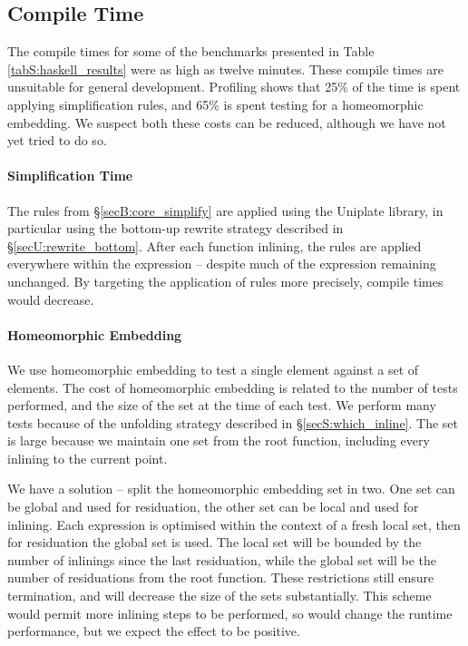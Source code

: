 \subsection{Compile Time}
\label{secS:compile_time}

The compile times for some of the benchmarks presented in Table \ref{tabS:haskell_results} were as high as twelve minutes. These compile times are unsuitable for general development. Profiling shows that 25\% of the time is spent applying simplification rules, and 65\% is spent testing for a homeomorphic embedding. We suspect both these costs can be reduced, although we have not yet tried to do so.

\paragraph{Simplification Time} The rules from \S\ref{secB:core_simplify} are applied using the Uniplate library, in particular using the bottom-up rewrite strategy described in \S\ref{secU:rewrite_bottom}. After each function inlining, the rules are applied everywhere within the expression -- despite much of the expression remaining unchanged. By targeting the application of rules more precisely, compile times would decrease.

\paragraph{Homeomorphic Embedding} We use homeomorphic embedding to test a single element against a set of elements. The cost of homeomorphic embedding is related to the number of tests performed, and the size of the set at the time of each test. We perform many tests because of the unfolding strategy described in \S\ref{secS:which_inline}. The set is large because we maintain one set from the root function, including every inlining to the current point.

We have a solution -- split the homeomorphic embedding set in two. One set can be global and used for residuation, the other set can be local and used for inlining. Each expression is optimised within the context of a fresh local set, then for residuation the global set is used. The local set will be bounded by the number of inlinings since the last residuation, while the global set will be the number of residuations from the root function. These restrictions still ensure termination, and will decrease the size of the sets substantially. This scheme would permit more inlining steps to be performed, so would change the runtime performance, but we expect the effect to be positive.


